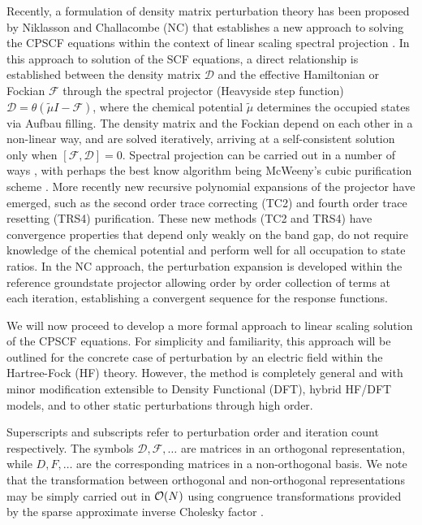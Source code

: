 \documentclass[prl,aps,twocolumn,showpacs,twocolumngrid,superbib]{revtex4}
\begin{document}
Recently, a formulation of density matrix perturbation theory has been proposed 
by Niklasson and Challacombe (NC) \cite{} that establishes a new approach to solving
the CPSCF equations within the context of linear scaling spectral projection \cite{}.  
In this approach to solution of the SCF equations, a direct relationship is established between 
the density matrix $\mathcal{D}$  and the effective Hamiltonian or Fockian $\mathcal{F}$ through 
the spectral projector (Heavyside step function) $\mathcal{D}=\theta(\tilde{\mu}I-\mathcal{F})$, 
where the chemical potential $\tilde{\mu}$ determines the occupied states via Aufbau filling.   
The density matrix and the Fockian depend on each other in a non-linear way, and are solved
iteratively, arriving at a self-consistent solution only when $[\mathcal{F},\mathcal{D}]=0$.
Spectral projection can be carried out in a number of ways \cite{}, with perhaps the best
know algorithm being McWeeny's cubic purification scheme \cite{}. 
More recently new recursive polynomial expansions of the projector have emerged, 
such as the second order trace correcting (TC2) \cite{} and fourth order trace resetting 
(TRS4) \cite{} purification.  These new methods (TC2 and TRS4) have convergence properties 
that depend only weakly on the band gap, do not require knowledge of the chemical potential
and perform well for all occupation to state ratios. In the NC approach, 
the perturbation expansion is developed within the reference groundstate projector allowing 
order by order collection of terms at each iteration, establishing a convergent sequence for
the response functions.  

We will now proceed to develop a more formal approach to linear scaling solution of the CPSCF equations.
For simplicity and familiarity, this approach will be outlined for the concrete case of 
perturbation by an electric field within the Hartree-Fock (HF) theory.  However, the method is 
completely general and with minor modification extensible to Density Functional (DFT), hybrid 
HF/DFT models, and to other static perturbations through high order.

Superscripts and subscripts refer to perturbation order and iteration count respectively.  
The symbols $\mathcal{D},\mathcal{F},\dots$  are  matrices in an orthogonal representation, while
$D,F,\dots$ are the corresponding matrices in a non-orthogonal basis.  We note that the transformation 
between orthogonal and non-orthogonal representations may be simply carried out in ${\cal O}(N)$ using
congruence transformations provided by the sparse approximate inverse Cholesky factor \cite{}.  
\end{document}
